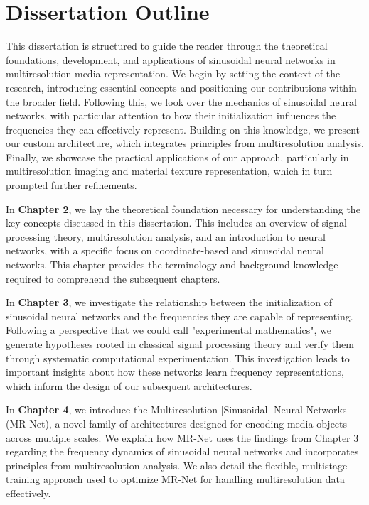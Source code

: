 \section{Dissertation Outline}

This dissertation is structured to guide the reader through the theoretical foundations, development, and applications of sinusoidal neural networks in multiresolution media representation. We begin by setting the context of the research, introducing essential concepts and positioning our contributions within the broader field. Following this, we look over the mechanics of sinusoidal neural networks, with particular attention to how their initialization influences the frequencies they can effectively represent. Building on this knowledge, we present our custom architecture, which integrates principles from multiresolution analysis. Finally, we showcase the practical applications of our approach, particularly in multiresolution imaging and material texture representation, which in turn prompted further refinements.

In \textbf{Chapter 2}, we lay the theoretical foundation necessary for understanding the key concepts discussed in this dissertation. This includes an overview of signal processing theory, multiresolution analysis, and an introduction to neural networks, with a specific focus on coordinate-based and sinusoidal neural networks. This chapter provides the terminology and background knowledge required to comprehend the subsequent chapters.

In \textbf{Chapter 3}, we investigate the relationship between the initialization of sinusoidal neural networks and the frequencies they are capable of representing. Following a perspective that we could call "experimental mathematics", we generate hypotheses rooted in classical signal processing theory and verify them through systematic computational experimentation. This investigation leads to important insights about how these networks learn frequency representations, which inform the design of our subsequent architectures.

In \textbf{Chapter 4}, we introduce the Multiresolution [Sinusoidal] Neural Networks (MR-Net), a novel family of architectures designed for encoding media objects across multiple scales. We explain how MR-Net uses the findings from Chapter 3 regarding the frequency dynamics of sinusoidal neural networks and incorporates principles from multiresolution analysis. We also detail the flexible, multistage training approach used to optimize MR-Net for handling multiresolution data effectively.

